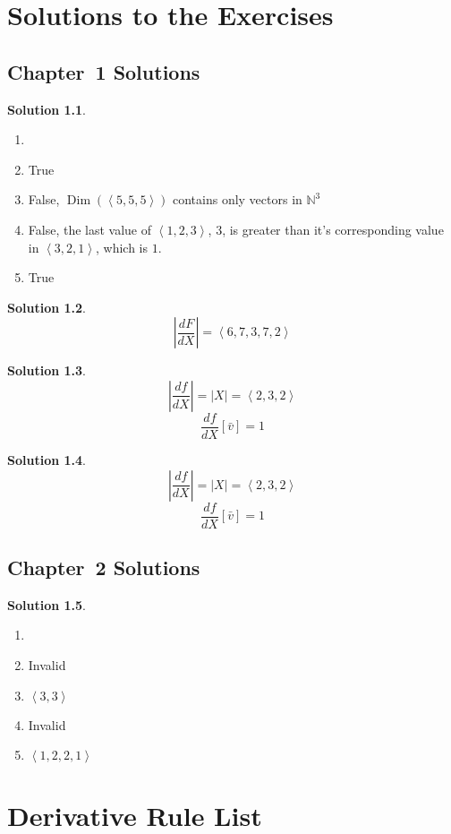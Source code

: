 \documentclass[12pt]{book}
\theoremstyle{plain}
\theoremstyle{definition}
\theoremstyle{ppart}
\theoremstyle{case}
\newcounter{solutionctr}
\theoremstyle{solution}
\newtheorem{solution}{Solution}
\newcommand{\solutionsection}[1]{
  \section{Chapter~#1 Solutions}\setcounter{solutionctr}{0}}
\DeclareMathOperator{\Dim}{Dim}
\newcommand{\shape}[1]{\left|#1\right|}
\begin{document}
\begin{appendices}

\chapter{Solutions to the Exercises}

\solutionsection{1}

\begin{solution}
\begin{enumerate}
\item[]
\item True
\item False, $\Dim(\left<5,5,5\right>)$ contains only vectors in $\mathbb{N}^3$ 
\item False, the last value of $\left<1,2,3\right>$, $3$, is greater than it's
						 corresponding value in $\left<3,2,1\right>$, which is $1$.
\item True
\end{enumerate}
\end{solution}

\begin{solution}
\[ \shape{\frac{dF}{dX}} = \left<6,7,3,7,2\right> \]
\end{solution}

\begin{solution}
\[ \shape{\frac{df}{dX}} = \shape{X} = \left<2,3,2\right> \]
\[ \frac{df}{dX}[\bar{v}] = 1 \]
\end{solution}

\begin{solution}
\[ \shape{\frac{df}{dX}} = \shape{X} = \left<2,3,2\right> \]
\[ \frac{df}{dX}[\bar{v}] = 1 \]
\end{solution}

\solutionsection{2}

\begin{solution}
\begin{enumerate}
\item[]
\item Invalid
\item $\left<3, 3\right>$
\item Invalid
\item $\left<1, 2, 2, 1\right>$
\end{enumerate}
\end{solution}

\chapter{Derivative Rule List}


\end{appendices}
\end{document}
